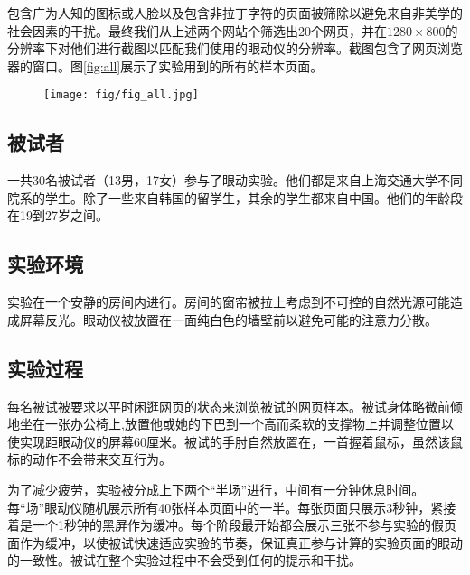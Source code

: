 

包含广为人知的图标或人脸以及包含非拉丁字符的页面被筛除以避免来自非美学的社会因素的干扰。最终我们从上述两个网站个筛选出20个网页，并在$1280\times800$的分辨率下对他们进行截图以匹配我们使用的眼动仪的分辨率。截图包含了网页浏览器的窗口。图\ref{fig:all}展示了实验用到的所有的样本页面。

\begin{figure}
  \centering
  \texttt{[image: fig/fig\_all.jpg]}
\end{figure}

\subsection{被试者}
一共30名被试者（13男，17女）参与了眼动实验。他们都是来自上海交通大学不同院系的学生。除了一些来自韩国的留学生，其余的学生都来自中国。他们的年龄段在19到27岁之间。

\subsection{实验环境}
实验在一个安静的房间内进行。房间的窗帘被拉上考虑到不可控的自然光源可能造成屏幕反光。眼动仪被放置在一面纯白色的墙壁前以避免可能的注意力分散。

\subsection{实验过程}
每名被试被要求以平时闲逛网页的状态来浏览被试的网页样本。被试身体略微前倾地坐在一张办公椅上,放置他或她的下巴到一个高而柔软的支撑物上并调整位置以使实现距眼动仪的屏幕60厘米。被试的手肘自然放置在，一首握着鼠标，虽然该鼠标的动作不会带来交互行为。

为了减少疲劳，实验被分成上下两个“半场”进行，中间有一分钟休息时间。每“场”眼动仪随机展示所有40张样本页面中的一半。每张页面只展示3秒钟，紧接着是一个1秒钟的黑屏作为缓冲。每个阶段最开始都会展示三张不参与实验的假页面作为缓冲，以使被试快速适应实验的节奏，保证真正参与计算的实验页面的眼动的一致性。被试在整个实验过程中不会受到任何的提示和干扰。


